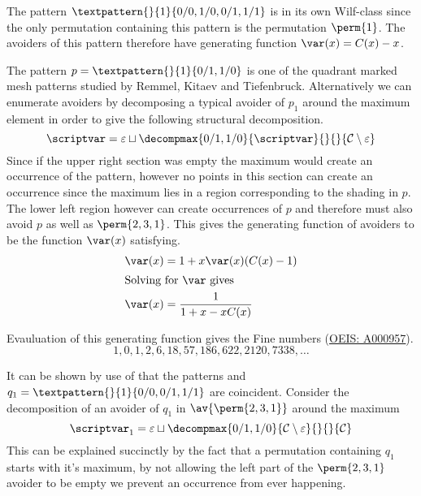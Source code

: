 The pattern \(\textpattern{}{1}{0/0,1/0,0/1,1/1}\) is in its own
Wilf-class since the only permutation containing this pattern is
the permutation \(\perm{1}\). The avoiders of this pattern therefore
have generating function \(\var(x) = C(x)-x\).

\nextvar
The pattern \(p = \textpattern{}{1}{0/1,1/0}\) is one of the
quadrant marked mesh patterns studied by Remmel,
Kitaev and Tiefenbruck\cite{2012arXiv1201.6243K}. Alternatively we can enumerate
avoiders by decomposing a typical avoider of \(p_1\) around the maximum element
in order to give the following structural decomposition.
\begin{equation*}
    \scriptvar = \varepsilon \sqcup \decompmax{0/1,1/0}{\scriptvar}{}{}{\mathcal{C}\setminus\varepsilon}
\end{equation*}
Since if the upper right section was empty the maximum would create an
occurrence of the pattern, however no points in this section can create
an occurrence since the maximum lies in a region corresponding to the
shading in \(p\). The lower left region however can create occurrences
of \(p\) and therefore must also avoid \(p\) as well as \(\perm{2,3,1}\).
This gives the generating function of avoiders to be the function \(\var(x)\)
satisfying.
\begin{align*}
    \var(x) &= 1 + x\var(x)(C(x)-1) \\
    \shortintertext{Solving for \(\var\) gives}
    \var(x) &= \frac{1}{1+x-xC(x)}
\end{align*}

Evauluation of this generating function gives the Fine numbers
(\href{https://oeis.org/A000957}{OEIS: A000957}).
\begin{equation*}
    1, 0, 1, 2, 6, 18, 57, 186, 622, 2120, 7338,\dotsc
\end{equation*}


\nextvar[\varfine]
It can be shown by use of  that the patterns
 and \(q_1 = \textpattern{}{1}{0/0,0/1,1/1}\) are
coincident. Consider the decomposition of an avoider of \(q_1\) in
\(\av{\perm{2,3,1}}\) around the maximum
\begin{equation*}
    \scriptvar_1 =\varepsilon \sqcup \decompmax{0/1,1/0}{\mathcal{C}\setminus\varepsilon}{}{}{\mathcal{C}}
\end{equation*}
This can be explained succinctly by the fact that a permutation containing
\(q_1\) starts with it's maximum, by not allowing the left part of the
\(\perm{2,3,1}\) avoider to be empty we prevent an occurrence from ever happening.

